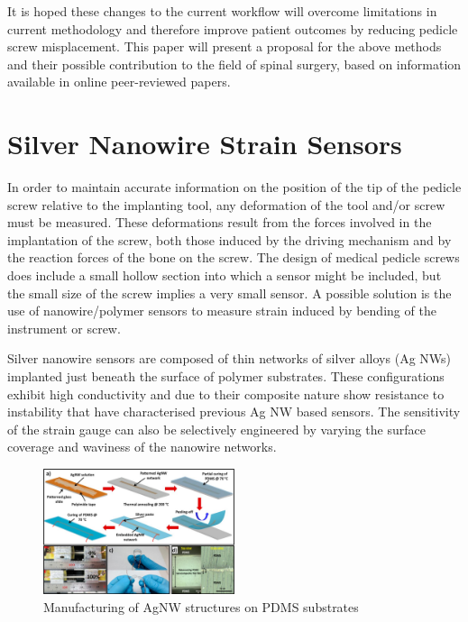 \documentclass[conference, a4paper]{IEEEtran}
\begin{document}
It is hoped these changes to the current workflow will
overcome limitations in current methodology and therefore improve patient outcomes by reducing pedicle screw
misplacement. This paper will present a proposal for the above methods and their possible contribution to the field
of spinal surgery, based on information available in online peer-reviewed papers.


\section{Silver Nanowire Strain Sensors}


In order to maintain accurate information on the position of the tip of the pedicle screw relative to the
implanting tool, any deformation of the tool and/or screw must be measured. These deformations result from the
forces involved in the implantation of the screw, both those induced by the driving mechanism and by the
reaction forces of the bone on the screw. The design of medical pedicle screws does include a small hollow
section into which a sensor might be included, but the small size of the screw implies a very small sensor. A
possible solution is the use of nanowire/polymer sensors to measure strain induced by bending of the instrument
or screw.

Silver nanowire sensors are composed of thin networks of silver alloys (Ag NWs) implanted just beneath the
surface of polymer substrates\cite{Amjadi2014}\cite{Lee2016}. These configurations exhibit high conductivity and due to their composite
nature show resistance to instability that have characterised previous Ag NW based sensors\cite{Lee2016}. The sensitivity
of the strain gauge can also be selectively engineered by varying the surface coverage and waviness of the
nanowire networks\cite{Xu2012}.

\begin{figure}[h!]
	\centering
	\includegraphics[width=0.5\textwidth]{assets/manufacturingNano.jpg}
	\caption{Manufacturing of AgNW structures on PDMS substrates\cite{Amjadi2014}}
	\label{fig:manufacture}
\end{figure}
\end{document}
